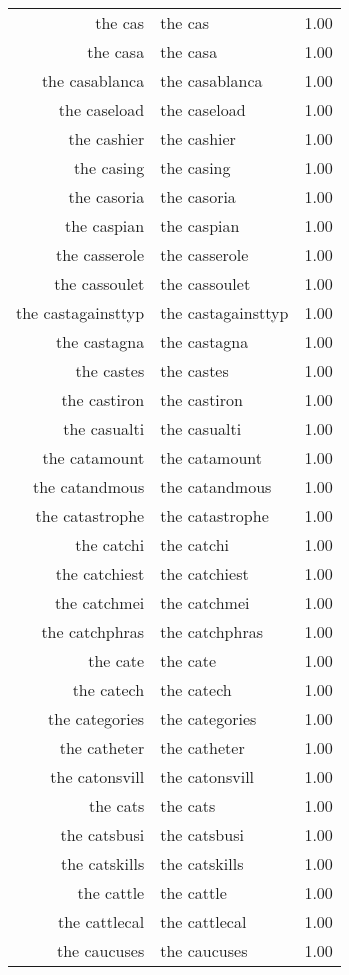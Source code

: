 \begin{table}[ht]
\begin{tabular}{rlr}
  the cas & the cas & 1.00 \\ 
  the casa & the casa & 1.00 \\ 
  the casablanca & the casablanca & 1.00 \\ 
  the caseload & the caseload & 1.00 \\ 
  the cashier & the cashier & 1.00 \\ 
  the casing & the casing & 1.00 \\ 
  the casoria & the casoria & 1.00 \\ 
  the caspian & the caspian & 1.00 \\ 
  the casserole & the casserole & 1.00 \\ 
  the cassoulet & the cassoulet & 1.00 \\ 
  the castagainsttyp & the castagainsttyp & 1.00 \\ 
  the castagna & the castagna & 1.00 \\ 
  the castes & the castes & 1.00 \\ 
  the castiron & the castiron & 1.00 \\ 
  the casualti & the casualti & 1.00 \\ 
  the catamount & the catamount & 1.00 \\ 
  the catandmous & the catandmous & 1.00 \\ 
  the catastrophe & the catastrophe & 1.00 \\ 
  the catchi & the catchi & 1.00 \\ 
  the catchiest & the catchiest & 1.00 \\ 
  the catchmei & the catchmei & 1.00 \\ 
  the catchphras & the catchphras & 1.00 \\ 
  the cate & the cate & 1.00 \\ 
  the catech & the catech & 1.00 \\ 
  the categories & the categories & 1.00 \\ 
  the catheter & the catheter & 1.00 \\ 
  the catonsvill & the catonsvill & 1.00 \\ 
  the cats & the cats & 1.00 \\ 
  the catsbusi & the catsbusi & 1.00 \\ 
  the catskills & the catskills & 1.00 \\ 
  the cattle & the cattle & 1.00 \\ 
  the cattlecal & the cattlecal & 1.00 \\ 
  the caucuses & the caucuses & 1.00 \\ 

\end{tabular}
\end{table}
